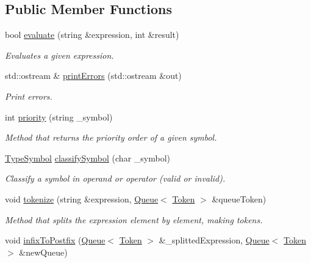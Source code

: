 \subsection*{Public Member Functions}
\begin{DoxyCompactItemize}
\item 
bool \hyperlink{classBares_a395824ed99727d00c9ff173982d1957f}{evaluate} (string \&expression, int \&result)
\begin{DoxyCompactList}\small\item\em Evaluates a given expression. \end{DoxyCompactList}\item 
std\+::ostream \& \hyperlink{classBares_a9ad20c39973cfbe8273f0dd85c65decc}{print\+Errors} (std\+::ostream \&out)
\begin{DoxyCompactList}\small\item\em Print errors. \end{DoxyCompactList}\item 
int \hyperlink{classBares_a9c1ac2f11c3d72d7e234cca8c7c92758}{priority} (string \+\_\+symbol)
\begin{DoxyCompactList}\small\item\em Method that returns the priority order of a given symbol. \end{DoxyCompactList}\item 
\hyperlink{classBares_a656cd507b0ddaa049dc7e6548459b6d8}{Type\+Symbol} \hyperlink{classBares_a1e097462a866c6a79eec5ab23c24099f}{classify\+Symbol} (char \+\_\+symbol)
\begin{DoxyCompactList}\small\item\em Classify a symbol in operand or operator (valid or invalid). \end{DoxyCompactList}\item 
void \hyperlink{classBares_a06e74726ac52890aa2c8665c01f23701}{tokenize} (string \&expression, \hyperlink{classQueue}{Queue}$<$ \hyperlink{structBares_1_1Token}{Token} $>$ \&queue\+Token)
\begin{DoxyCompactList}\small\item\em Method that splits the expression element by element, making tokens. \end{DoxyCompactList}\item 
void \hyperlink{classBares_a9e4e33a9e2d2d9e67708c2aafe31f72f}{infix\+To\+Postfix} (\hyperlink{classQueue}{Queue}$<$ \hyperlink{structBares_1_1Token}{Token} $>$ \&\+\_\+splitted\+Expression, \hyperlink{classQueue}{Queue}$<$ \hyperlink{structBares_1_1Token}{Token} $>$ \&new\+Queue)

\end{DoxyCompactItemize}
